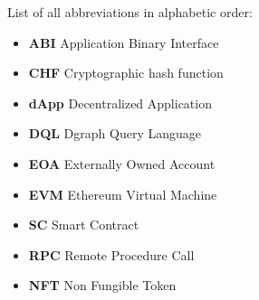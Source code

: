 
List of all abbreviations in alphabetic order:

\begin{itemize}
    \item \textbf{ABI} Application Binary Interface
    \item \textbf{CHF} Cryptographic hash function
    \item \textbf{dApp} Decentralized Application
    \item \textbf{DQL} Dgraph Query Language
    \item \textbf{EOA} Externally Owned Account
    \item \textbf{EVM} Ethereum Virtual Machine
    \item \textbf{SC} Smart Contract
    \item \textbf{RPC} Remote Procedure Call
    \item \textbf{NFT} Non Fungible Token
\end{itemize}